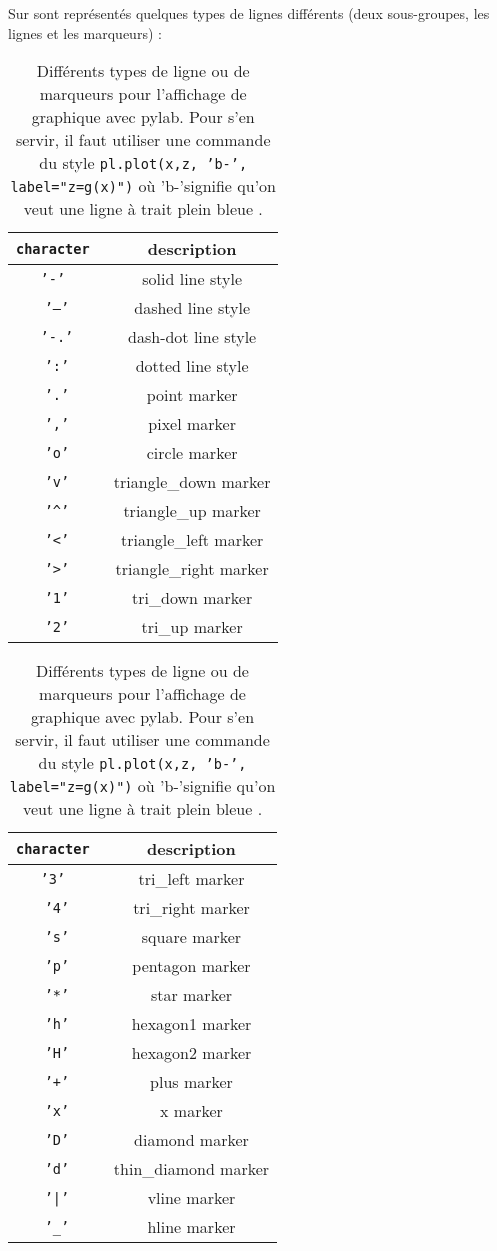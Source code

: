 \documentclass[a4paper,twoside]{article}
\begin{document}
Sur  sont représentés quelques types de lignes différents (deux sous-groupes, les lignes et les marqueurs) : 
\begin{table}[htb]
\hfill
\begin{tabular}{|>{\tt}c<{}|c|}
\hline
character & description\\\hline
'-' & solid line style\\\hline
'--' & dashed line style\\\hline
'-.' & dash-dot line style\\\hline
':' & dotted line style\\\hline
'.' & point marker\\\hline
',' & pixel marker\\\hline
'o' & circle marker\\\hline
'v' & triangle\_down marker\\\hline
'\textasciicircum' & triangle\_up marker\\\hline
'<' & triangle\_left marker\\\hline
'>' & triangle\_right marker\\\hline
'1' & tri\_down marker\\\hline
'2' & tri\_up marker\\\hline
\end{tabular}
\hfill
\begin{tabular}{|>{\tt}c<{}|c|}
\hline
character & description\\\hline
'3' & tri\_left marker\\\hline
'4' & tri\_right marker\\\hline
's' & square marker\\\hline
'p' & pentagon marker\\\hline
'*' & star marker\\\hline
'h' & hexagon1 marker\\\hline
'H' & hexagon2 marker\\\hline
'+' & plus marker\\\hline
'x' & x marker\\\hline
'D' & diamond marker\\\hline
'd' & thin\_diamond marker\\\hline
'|' & vline marker\\\hline
'\_' & hline marker\\\hline
\end{tabular}\hfill~

\caption{Différents types de ligne ou de marqueurs pour l'affichage de graphique avec pylab. Pour s'en servir, il faut utiliser une commande du style \texttt{pl.plot(x,z, 'b-', label="z=g(x)")} où \og 'b-'\fg signifie qu'on veut une ligne à trait plein bleue .}\label{tab:type_ligne}
\end{table}
\end{document}
